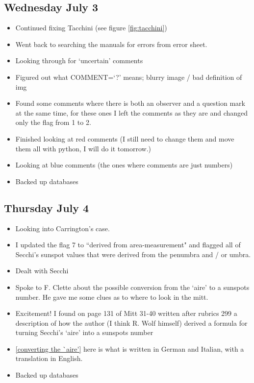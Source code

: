 \documentclass[12pt]{article}
\begin{document}
\subsection{Wednesday July 3}\label{what is flag 2 question mark}
\begin{itemize}
    \item Continued fixing Tacchini (see figure \ref{fig:tacchini})
    \item Went back to searching the manuals for errors from error sheet. 
    \item Looking through for `uncertain' comments
    \item Figured out what COMMENT=`?' means; blurry image / bad definition of img
    \item Found some comments where there is both an observer and a question mark at the same time, for these ones I left the comments as they are and changed only the flag from 1 to 2.
    \item Finished looking at red comments (I still need to change them and move them all with python, I will do it tomorrow.) 
    \item Looking at blue comments (the ones where comments are just numbers)
    \item Backed up databases
    \end{itemize}
            
\subsection{Thursday July 4}
\begin{itemize}
    \item Looking into Carrington's case.
    \item I updated the flag 7 to ``derived from area-measurement" and flagged all of Secchi's sunspot values that were derived from the penumbra and / or umbra.
    \item Dealt with Secchi
    \item Spoke to F. Clette about the possible conversion from the `aire' to a sunspots number. He gave me some clues as to where to look in the mitt.
    \item Excitement! I found on page 131 of Mitt 31-40 written after rubrics 299 a description of how the author (I think R. Wolf himself) derived a formula for turning Secchi's `aire' into a sunspots number
    \item \ref{converting the `aire'} here is what is written in German and Italian, with a translation in English.
    \item Backed up databases
\end{itemize}
        
\end{document}
